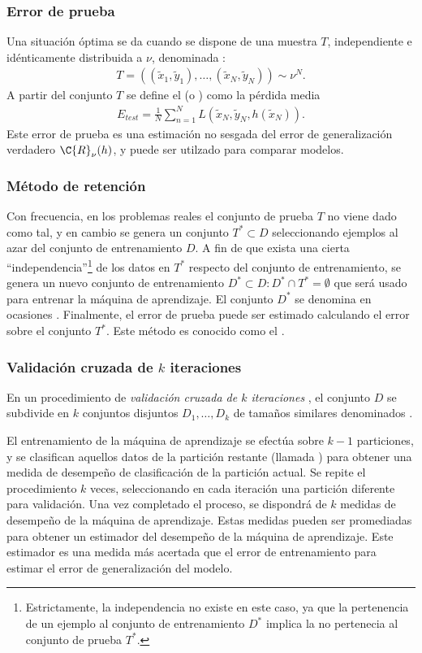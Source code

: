 \subsubsection{Error de prueba}
%
Una situación óptima se da cuando se dispone de una muestra $T$,
independiente e idénticamente distribuida a $\nu$, denominada
:
%
\begin{align}
  T=((\tilde{x}_1,\tilde{y}_1),\ldots,(\tilde{x}_N,\tilde{y}_N))\sim\nu^N.
  \label{eq:conj-prueba}
\end{align}
%
A partir del conjunto $T$ se define el 
(o ) como la pérdida media
%
\begin{align}
  E_{test}=\frac{1}{N}\sum_{n=1}^N
  L(\tilde{x}_N,\tilde{y}_N,h(\tilde{x}_N)).
  \label{eq:error-prueba}
\end{align}
%
Este error de prueba es una estimación no sesgada del error de
generalización verdadero $\C{R}_\nu(h)$, y puede ser utilzado para
comparar modelos.
%
\subsubsection{Método de retención}
\label{retencion}
%
Con frecuencia, en los problemas reales el conjunto de prueba $T$ no
viene dado como tal, y en cambio se genera un conjunto $T^*\subset{}D$
seleccionando ejemplos al azar del conjunto de entrenamiento $D$.  A
fin de que exista una cierta ``independencia''\footnote{Estrictamente,
  la independencia no existe en este caso, ya que la pertenencia de un
  ejemplo al conjunto de entrenamiento $D^*$ implica la no pertenecia
  al conjunto de prueba $T^*$.} de los datos en $T^*$ respecto del
conjunto de entrenamiento, se genera un nuevo conjunto de entrenamiento
$D^*\subset{}D:D^*\cap{}T^*=\emptyset$ que será usado para entrenar la
máquina de aprendizaje. El conjunto $D^*$ se denomina en ocasiones
.
Finalmente, el error de prueba puede ser estimado calculando el error
sobre el conjunto $T^*$. Este método es conocido como el .
%
\subsubsection{Validación cruzada de $k$ iteraciones}
%
En un procedimiento de \emph{validación cruzada de $k$ iteraciones}
\cite{crossval}, el conjunto $D$ se subdivide en $k$ conjuntos
disjuntos $D_1,\ldots,D_k$ de tamaños similares denominados
.

El entrenamiento de la máquina de aprendizaje se efectúa sobre $k-1$
particiones, y se clasifican aquellos datos de la partición restante
(llamada ) para obtener una medida de desempeño de
clasificación de la partición actual. Se repite el procedimiento $k$
veces, seleccionando en cada iteración una partición diferente para
validación.  Una vez completado el proceso, se dispondrá de $k$
medidas de desempeño de la máquina de aprendizaje. Estas medidas
pueden ser promediadas para obtener un estimador del desempeño de la
máquina de aprendizaje. Este estimador es una medida más acertada que
el error de entrenamiento para estimar el error de generalización del
modelo.

